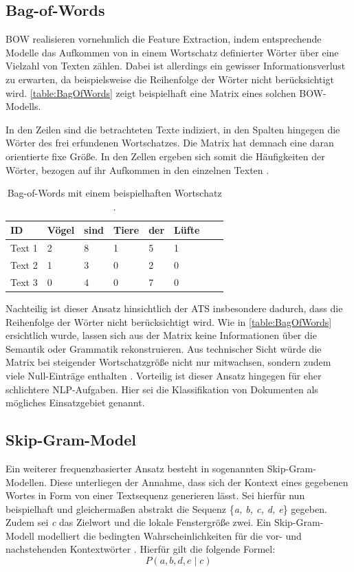 \subsection{Bag-of-Words}
\noindent
\ac{BOW} realisieren vornehmlich die Feature Extraction, indem entsprechende Modelle das Aufkommen von in einem Wortschatz definierter Wörter über eine Vielzahl von Texten zählen. Dabei ist allerdings ein gewisser Informationsverlust zu erwarten, da beispielsweise die Reihenfolge der Wörter nicht berücksichtigt wird. \autoref{table:BagOfWords} zeigt beispielhaft eine Matrix eines solchen \ac{BOW}-Modells.
\newpage

\noindent
In den Zeilen sind die betrachteten Texte indiziert, in den Spalten hingegen die Wörter des frei erfundenen Wortschatzes. Die Matrix hat demnach eine daran orientierte fixe Größe. In den Zellen ergeben sich somit die Häufigkeiten der Wörter, bezogen auf ihr Aufkommen in den einzelnen Texten \cite{BRO19}.

\begin{table}[htb]
\centering
\begin{tabular}{ | p{1.8cm} | p{1.8cm} | p{1.8cm} | p{1.8cm} | p{1.8cm} | p{1.8cm} | p{1.8cm} | p{1.8cm} | }
\hline
\textbf{ID} & \textbf{Vögel} & \textbf{sind} & \textbf{Tiere} & \textbf{der} & \textbf{Lüfte} \\
\hline
Text 1 & 2 & 8 & 1 & 5 & 1 \\
\hline
Text 2 & 1 & 3 & 0 & 2 & 0 \\
\hline
Text 3 & 0 & 4 & 0 & 7 & 0 \\
\hline
\end{tabular}
\caption{Bag-of-Words mit einem beispielhaften Wortschatz \cite{HUI20}.}
\label{table:BagOfWords}
\end{table}

\noindent
Nachteilig ist dieser Ansatz hinsichtlich der \ac{ATS} insbesondere dadurch, dass die Reihenfolge der Wörter nicht berücksichtigt wird. Wie in \autoref{table:BagOfWords} ersichtlich wurde, lassen sich aus der Matrix keine Informationen über die Semantik oder Grammatik rekonstruieren. Aus technischer Sicht würde die Matrix bei steigender Wortschatzgröße nicht nur mitwachsen, sondern zudem viele Null-Einträge enthalten \cite{HUI20}. Vorteilig ist dieser Ansatz hingegen für eher schlichtere \ac{NLP}-Aufgaben. Hier sei die Klassifikation von Dokumenten als mögliches Einsatzgebiet genannt.


\subsection{Skip-Gram-Model}
\noindent
Ein weiterer frequenzbasierter Ansatz besteht in sogenannten Skip-Gram-Modellen. Diese unterliegen der Annahme, dass sich der Kontext eines gegebenen Wortes in Form von einer Textsequenz generieren lässt. Sei hierfür nun beispielhaft und gleichermaßen abstrakt die Sequenz {\{\textit{a, b, c, d, e}\}} gegeben. Zudem sei \textit{c} das Zielwort und die lokale Fenstergröße zwei. Ein Skip-Gram-Modell modelliert die bedingten Wahrscheinlichkeiten für die vor- und nachstehenden Kontextwörter \cite[S.~640]{ZHA20}. Hierfür gilt die folgende Formel: $$P(a, b, d, e \mid c)$$


